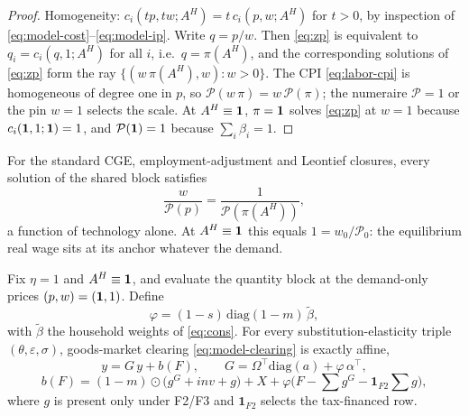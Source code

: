 \begin{proof}
Homogeneity: $c_i(tp, tw; A^{H}) = t\, c_i(p,w;A^{H})$ for $t>0$, by inspection of
\eqref{eq:model-cost}--\eqref{eq:model-ip}. Write $q = p/w$. Then \eqref{eq:zp} is
equivalent to $q_i = c_i(q,1;A^{H})$ for all $i$, i.e.\ $q = \pi(A^{H})$, and
the corresponding solutions of \eqref{eq:zp} form the ray
$\{(w\,\pi(A^{H}), w):w>0\}$. The
CPI \eqref{eq:labor-cpi} is homogeneous of degree one in $p$, so
$\mathcal{P}(w\,\pi) = w\,\mathcal{P}(\pi)$; the numeraire $\mathcal{P} = 1$ or the pin $w = 1$
selects the scale. At $A^{H} \equiv \mathbf{1}$, $\pi = \mathbf{1}$ solves
\eqref{eq:zp} at $w = 1$ because $c_i(\mathbf{1},1;\mathbf{1}) = 1$, and $\mathcal{P}(\mathbf{1}) = 1$ because $\sum_i \beta_i = 1$.
\end{proof}

\begin{corollary}\label{cor:realwage}
For the standard CGE, employment-adjustment and Leontief closures,
every solution of the shared block satisfies
\begin{equation}
\frac{w}{\mathcal{P}(p)} = \frac{1}{\mathcal{P}(\pi(A^{H}))},
\end{equation}
a function of technology alone. At $A^{H} \equiv \mathbf{1}$ this equals $1 =
w_0/\mathcal{P}_0$: the equilibrium real wage sits at its anchor whatever the
demand.
\end{corollary}

\begin{lemma}\label{lem:affine}
Fix $\eta = 1$ and $A^{H} \equiv \mathbf{1}$, and evaluate the quantity block at the
demand-only prices $(p,w) = (\mathbf{1},1)$. Define
\[
\varphi = (1-s)\,\mathrm{diag}(1-m)\,\widetilde{\beta},
\]
with $\widetilde{\beta}$ the household weights of \eqref{eq:cons}.
For every substitution-elasticity triple $(\theta,\varepsilon,\sigma)$,
goods-market clearing \eqref{eq:model-clearing} is exactly affine,
\begin{equation}
y = G\, y + b(F),
\qquad
G = \Omega^{\!\top}\mathrm{diag}(a)
  + \varphi\,\alpha^{\!\top},
\label{eq:affine}
\end{equation}
\begin{equation}
b(F) = (1-m)\odot\big( g^G + inv + g \big) + X
     + \varphi
       \big( F - \textstyle\sum g^G - \mathbf{1}_{F2}\textstyle\sum g \big),
\label{eq:bvec}
\end{equation}
where $g$ is present only under F2/F3 and $\mathbf{1}_{F2}$ selects the
tax-financed row.
\end{lemma}

